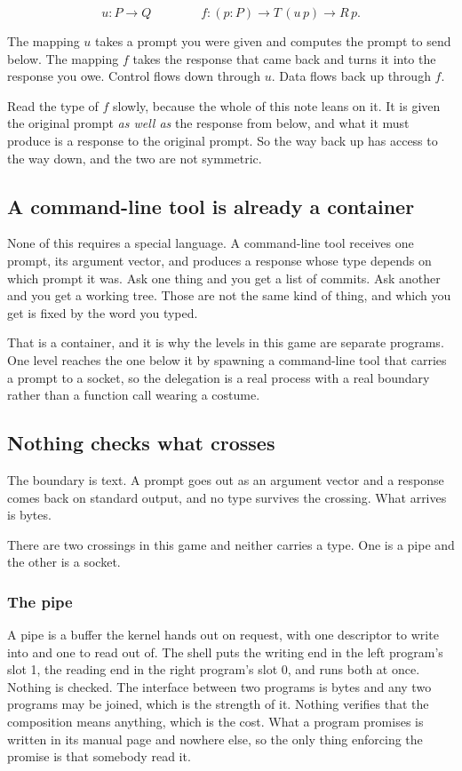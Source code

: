 \documentclass[11pt,a4paper]{article}
\begin{document}
\[ u : P \to Q \qquad\qquad f : (p : P) \to T\,(u\,p) \to R\,p. \]

The mapping $u$ takes a prompt you were given and computes the prompt to send below. The mapping
$f$ takes the response that came back and turns it into the response you owe. Control flows down
through $u$. Data flows back up through $f$.

Read the type of $f$ slowly, because the whole of this note leans on it. It is given the original
prompt \emph{as well as} the response from below, and what it must produce is a response to the original
prompt. So the way back up has access to the way down, and the two are not symmetric.

\subsection{A command-line tool is already a container}

None of this requires a special language. A command-line tool receives one prompt, its argument
vector, and produces a response whose type depends on which prompt it was. Ask one thing and you get
a list of commits. Ask another and you get a working tree. Those are not the same kind of thing,
and which you get is fixed by the word you typed.

That is a container, and it is why the levels in this game are separate programs. One level
reaches the one below it by spawning a command-line tool that carries a prompt to a socket, so
the delegation is a real process with a real boundary rather than a function call wearing a
costume.

\subsection{Nothing checks what crosses}
\label{sec:crosses}

The boundary is text. A prompt goes out as an argument vector and a response comes back on standard
output, and no type survives the crossing. What arrives is bytes.

There are two crossings in this game and neither carries a type. One is a pipe and the other is a
socket.

\subsubsection*{The pipe}

A pipe is a buffer the kernel hands out on request, with one descriptor to write into and one to
read out of. The shell puts the writing end in the left program's slot 1, the reading end in the
right program's slot 0, and runs both at once. Nothing is checked. The interface between two
programs is bytes and any two programs may be joined, which is the strength of it. Nothing verifies
that the composition means anything, which is the cost. What a program promises is written in its
manual page and nowhere else, so the only thing enforcing the promise is that somebody read it.
\end{document}
